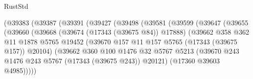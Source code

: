\begin{lexlean}{RustStd}
\begin{coremodule}
                                  (@39383
                                    (@39387
                                      (@39391
                                        (@39427
                                          (@39498
                                            (@39581
                                              (@39599
                                                (@39647
                                                  (@39655
                                                    (@39660
                                                      (@39668
                                                        (@39674 (@17343 (@39675 @84)) @17888)
                                                        (@39662
                                                          @358
                                                          @362
                                                          @11
                                                          @1878
                                                          @5765
                                                          @19452
                                                          (@39670
                                                            @157
                                                            @11
                                                            @157
                                                            @5765
                                                            (@17343 (@39675 @157))
                                                            @20104)
                                                          (@39662
                                                            @360
                                                            @100
                                                            @1476
                                                            @32
                                                            @5767
                                                            @5213
                                                            (@39670
                                                              @243
                                                              @1476
                                                              @243
                                                              @5767
                                                              (@17343 (@39675 @243))
                                                              @20121)
                                                            (@17360 @39603 @4985)))))

\end{coremodule}
\end{lexlean}
